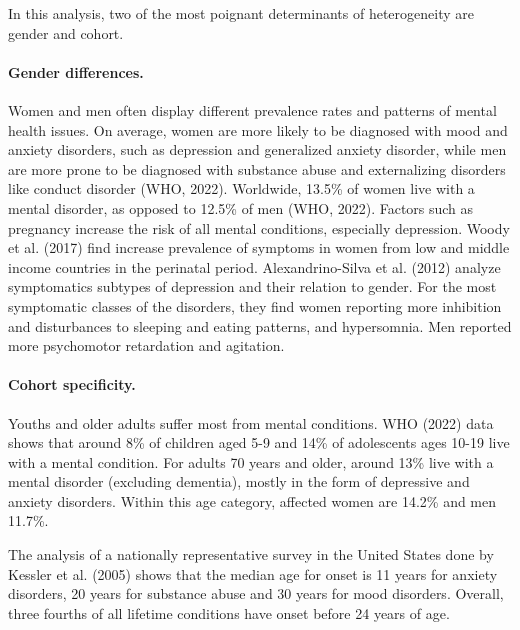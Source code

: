         In this analysis, two of the most poignant determinants of heterogeneity are gender and cohort. 


    \paragraph{Gender differences.}
        Women and men often display different prevalence rates and patterns of mental health issues.
        On average, women are more likely to be diagnosed with mood and anxiety disorders, such as depression and generalized anxiety disorder, while men are more prone to be diagnosed with substance abuse and externalizing disorders like conduct disorder (WHO, 2022). Worldwide, 13.5\% of women live with a mental disorder, as opposed to 12.5\% of men (WHO, 2022). 
        Factors such as pregnancy increase the risk of all mental conditions, especially depression. Woody et al. (2017) find increase prevalence of symptoms in women from low and middle income countries in the perinatal period. 
        Alexandrino-Silva et al. (2012) analyze symptomatics subtypes of depression and their relation to gender. For the most symptomatic classes of the disorders, they find women reporting more inhibition and disturbances to sleeping and eating patterns, and hypersomnia. Men reported more psychomotor retardation and agitation. 


    \paragraph{Cohort specificity.}
    Youths and older adults suffer most from mental conditions. WHO (2022) data shows that around 8\% of children aged 5-9 and 14\% of adolescents ages 10-19 live with a mental condition. For adults 70 years and older, around 13\% live with a mental disorder (excluding dementia), mostly in the form of depressive and anxiety disorders. Within this age category, affected women are 14.2\% and men 11.7\%.

    The analysis of a nationally representative survey in the United States done by Kessler et al. (2005) shows that the median age for onset is 11 years for anxiety disorders, 20 years for substance abuse and 30 years for mood disorders. Overall, three fourths of all lifetime conditions have onset before 24 years of age. 

